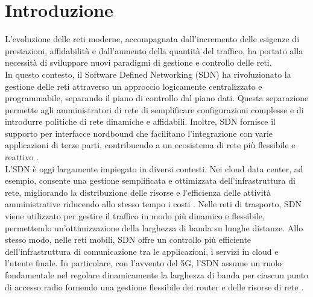 \chapter{Introduzione}
L’evoluzione delle reti moderne, accompagnata dall’incremento delle esigenze di prestazioni, affidabilità e dall'aumento della quantità del traffico, ha portato alla necessità di sviluppare nuovi paradigmi di gestione e controllo delle reti. 
\\In questo contesto, il Software Defined Networking (SDN) ha rivoluzionato la gestione delle reti attraverso un approccio logicamente centralizzato e programmabile, separando il piano di controllo dal piano dati.
Questa separazione permette agli amministratori di rete di semplificare configurazioni complesse e di introdurre politiche di rete dinamiche e affidabili.
Inoltre, SDN fornisce il supporto per interfacce nordbound che facilitano l'integrazione con varie applicazioni di terze parti, contribuendo a un ecosistema di rete più flessibile e reattivo \cite{sdnart}.
\\L’SDN è oggi largamente impiegato in diversi contesti. 
Nei cloud data center, ad esempio, consente una gestione semplificata e ottimizzata dell’infrastruttura di rete, migliorando la distribuzione delle risorse e l'efficienza  delle attività amministrative riducendo allo stesso tempo i costi \cite{datacent}. 
Nelle reti di trasporto, SDN viene utilizzato per gestire il traffico in modo più dinamico e flessibile, permettendo un'ottimizzazione della larghezza di banda su lunghe distanze. Allo stesso modo, 
nelle reti mobili, SDN offre un controllo più efficiente dell'infrastruttura di comunicazione
tra le applicazioni, i servizi in cloud e l'utente finale. 
In particolare, con l'avvento del 5G, l'SDN assume un ruolo fondamentale nel regolare dinamicamente la larghezza di banda per ciascun punto di accesso radio fornendo una gestione flessibile dei router e delle risorse di rete\cite{5g} \cite{5gart}.
